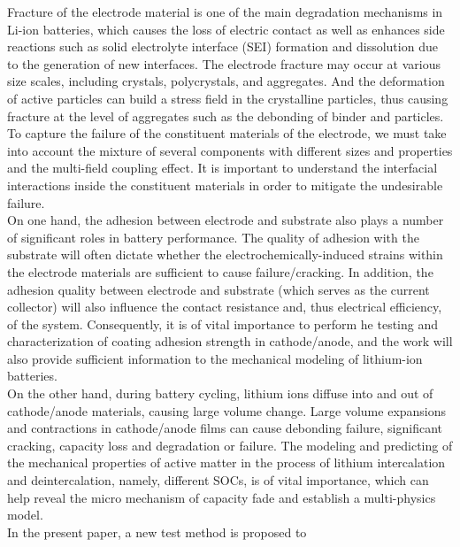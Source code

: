 \begin{eabstract}
Fracture of the electrode material is one of the main degradation
mechanisms in Li-ion batteries, which causes the loss of electric
contact as well as enhances side reactions such as solid electrolyte interface (SEI) formation and dissolution due to the generation of new
interfaces. The electrode fracture may occur at various size scales, including crystals, polycrystals, and aggregates. And the deformation of
active particles can build a stress field in the crystalline
particles, thus
causing fracture at the level of aggregates such as the
debonding of binder and particles. To capture the failure of the constituent materials of the electrode, we must take into account
the mixture of several components with different sizes and properties and the multi-field coupling effect. It is important to understand the interfacial interactions inside the
constituent materials in order to mitigate the undesirable failure.\\
\indent On one hand, the adhesion between electrode and substrate also plays a number of significant roles in battery performance. The quality
of adhesion with the substrate will often dictate whether the electrochemically-induced
strains within the electrode materials are sufficient to cause failure/cracking. In addition,
the adhesion quality between electrode and substrate (which serves as the current collector)
will also influence the contact resistance and, thus electrical efficiency, of the system. Consequently, it is of vital importance to perform he testing and characterization of coating adhesion strength in cathode/anode, and the work will also provide sufficient information to  the mechanical modeling of lithium-ion batteries. \\
\indent  On the other hand, during battery cycling, lithium ions diffuse into and out of cathode/anode materials, causing large volume change. Large volume expansions and contractions in cathode/anode films can cause debonding failure,
significant cracking, capacity loss and degradation or failure. The modeling and predicting of the mechanical properties of active matter in the process of lithium intercalation and deintercalation, namely, different SOCs, is of vital importance, which can help reveal the micro mechanism of capacity fade and establish a multi-physics model.\\
\indent In the present paper, a new test method is proposed to

\end{eabstract}
